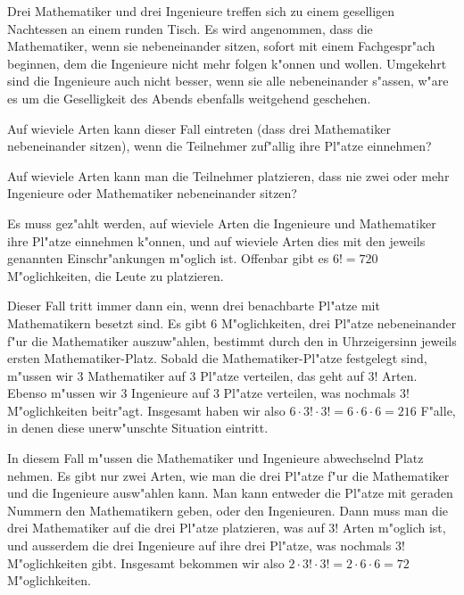 Drei Mathematiker und drei Ingenieure treffen sich zu einem
geselligen Nachtessen an einem runden Tisch.
Es wird angenommen, dass die Mathematiker, wenn sie nebeneinander
sitzen, sofort mit einem Fachgespr"ach beginnen, dem
die Ingenieure nicht mehr folgen k"onnen und wollen. Umgekehrt
sind die Ingenieure auch nicht besser, wenn sie alle nebeneinander
s"assen, w"are es um die Geselligkeit des Abends ebenfalls weitgehend
geschehen.
\begin{teilaufgaben}
\item
Auf wieviele Arten kann dieser Fall eintreten (dass drei Mathematiker
nebeneinander sitzen),
wenn die Teilnehmer zuf"allig ihre Pl"atze einnehmen?
\item
Auf wieviele Arten kann man die Teilnehmer platzieren, dass nie zwei oder
mehr Ingenieure oder Mathematiker nebeneinander sitzen?
\end{teilaufgaben}

\begin{loesung}
Es muss gez"ahlt werden, auf wieviele Arten die Ingenieure und Mathematiker
ihre Pl"atze einnehmen k"onnen, und auf wieviele Arten dies mit den
jeweils genannten Einschr"ankungen m"oglich ist. Offenbar gibt es $6!=720$
M"oglichkeiten, die Leute zu platzieren.
\begin{teilaufgaben}
\item Dieser Fall tritt immer dann ein, wenn drei benachbarte Pl"atze
mit Mathematikern besetzt sind.
Es gibt 6 M"oglichkeiten, drei Pl"atze
nebeneinander f"ur die Mathematiker auszuw"ahlen, bestimmt durch den
in Uhrzeigersinn jeweils ersten Mathematiker-Platz.
Sobald die Mathematiker-Pl"atze festgelegt sind, m"ussen wir 3 Mathematiker
auf 3 Pl"atze verteilen, das geht auf $3!$ Arten. Ebenso m"ussen wir
3 Ingenieure auf 3 Pl"atze verteilen, was nochmals $3!$ M"oglichkeiten
beitr"agt. Insgesamt haben wir also $6\cdot 3!\cdot 3!=6\cdot 6\cdot 6=216$
F"alle, in denen diese unerw"unschte Situation eintritt.
\item In diesem Fall m"ussen die Mathematiker und Ingenieure abwechselnd
Platz nehmen. Es gibt nur zwei Arten, wie man die drei Pl"atze f"ur die
Mathematiker und die Ingenieure ausw"ahlen kann. Man kann entweder die
Pl"atze mit geraden Nummern den Mathematikern geben, oder den Ingenieuren.
Dann muss man die drei Mathematiker auf die drei Pl"atze platzieren,
was auf $3!$ Arten m"oglich ist, und ausserdem die drei Ingenieure auf
ihre drei Pl"atze, was nochmals $3!$ M"oglichkeiten gibt. Insgesamt bekommen
wir also $2\cdot 3!\cdot 3!=2\cdot 6\cdot 6=72$ M"oglichkeiten.
\qedhere
\end{teilaufgaben}
\end{loesung}
